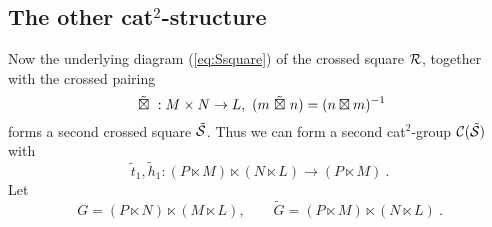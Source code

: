 \vspace*{5mm} 
\subsection{The other cat$^2$-structure}

Now the underlying diagram (\ref{eq:Ssquare}) of the crossed square $\mathcal{R}$, 
together with the crossed pairing 
$$
\ \tilde{\boxtimes}\  : M \times N \to L, \ (m \ \tilde{\boxtimes}\  n) = (n \boxtimes m)^{-1}
$$
forms a second crossed square $\tilde{\mathcal{S}}$. 
Thus we can form a second cat$^2$-group $\mathcal{C}(\tilde{\mathcal{S}})$ with 
$$
\tilde{t}_1,\tilde{h}_1 : (P \ltimes M) \ltimes (N \ltimes L) \to (P \ltimes M)~.
$$
Let
$$
G = (P \ltimes N) \ltimes (M \ltimes L), \qquad 
\tilde{G} = (P \ltimes M) \ltimes (N \ltimes L)~. 
$$

